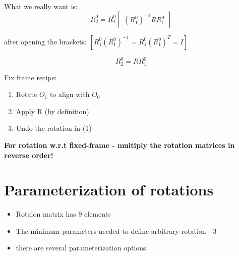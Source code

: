 \documentclass{article}
\begin{document}
What we really want is:\\
$$R^{0}_2 = R^{0}_1\begin{bmatrix}
(R^{0}_1)^{-1}RR^{0}_{1}
\end{bmatrix}  $$

after opening the brackets: 
$\left[ R^{0}_1(R^{0}_1)^{-1} = R^{0}_1(R^{0}_1)^{T} = I \right] $

$$R^{0}_2 = RR^{0}_{1}  $$

Fix frame recipe:
\begin{enumerate}
    \item Rotate $O_1$ to align with $O_0$
    \item Apply R (by definition)
    \item Undo the rotation in (1)
\end{enumerate}

\textbf{For rotation w.r.t fixed-frame - multiply the rotation matrices in reverse order!}

\section{Parameterization of rotations}
\begin{itemize}
    \item Rotaion matrix has 9 elements
    \item The minimum parameters needed to define arbitrary rotation - 3
    \item there are several parameterization options.
\end{itemize}
\end{document}
